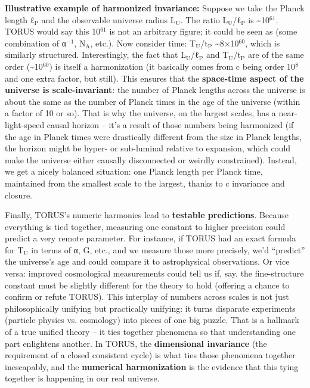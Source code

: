 \documentclass[]{article}
\newcommand{\subscript}[1]{\ensuremath{_{\mathrm{#1}}}}
\newcommand{\superscript}[1]{\ensuremath{^{\mathrm{#1}}}}
\begin{document}
\textbf{Illustrative example of harmonized invariance:} Suppose we take
the Planck length
ℓ\subscript{P} and the
observable universe radius
L\subscript{U}. The ratio
L\subscript{U}/ℓ\subscript{P}
is \textasciitilde{}10\superscript{61}. TORUS would say this 10\superscript{61} is not an
arbitrary figure; it could be seen as (some combination of α\superscript{−1},
N\subscript{A}, etc.). Now
consider time:
T\subscript{U}/t\subscript{P}
\textasciitilde{}8×10\superscript{60}, which is similarly structured.
Interestingly, the fact that
L\subscript{U}/ℓ\subscript{P}
and
T\subscript{U}/t\subscript{P}
are of the same order (\textasciitilde{}10\superscript{60}) is itself a
harmonization (it basically comes from c being order 10\superscript{8} and one
extra factor, but still). This ensures that the \textbf{space-time
aspect of the universe is scale-invariant}: the number of Planck lengths
across the universe is about the same as the number of Planck times in
the age of the universe (within a factor of 10 or so). That is why the
universe, on the largest scales, has a near-light-speed causal horizon
-- it's a result of those numbers being harmonized (if the age in Planck
times were drastically different from the size in Planck lengths, the
horizon might be hyper- or sub-luminal relative to expansion, which
could make the universe either causally disconnected or weirdly
constrained). Instead, we get a nicely balanced situation: one Planck
length per Planck time, maintained from the smallest scale to the
largest, thanks to c invariance and closure​.

Finally, TORUS's numeric harmonies lead to \textbf{testable
predictions}. Because everything is tied together, measuring one
constant to higher precision could predict a very remote parameter. For
instance, if TORUS had an exact formula for
T\subscript{U} in terms of
α, G, etc., and we measure those more precisely, we'd ``predict'' the
universe's age and could compare it to astrophysical observations. Or
vice versa: improved cosmological measurements could tell us if, say,
the fine-structure constant must be slightly different for the theory to
hold (offering a chance to confirm or refute TORUS). This interplay of
numbers across scales is not just philosophically unifying but
practically unifying: it turns disparate experiments (particle physics
vs. cosmology) into pieces of one big puzzle. That is a hallmark of a
true unified theory -- it ties together phenomena so that understanding
one part enlightens another. In TORUS, the \textbf{dimensional
invariance} (the requirement of a closed consistent cycle) is what ties
those phenomena together inescapably, and the \textbf{numerical
harmonization} is the evidence that this tying together is happening in
our real universe​.
\end{document}
